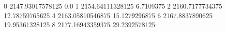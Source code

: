 0 2147.93017578125 0.0
1 2154.64111328125 6.7109375
2 2160.7177734375 12.78759765625
4 2163.05810546875 15.1279296875
6 2167.8837890625 19.95361328125
8 2177.16943359375 29.2392578125

